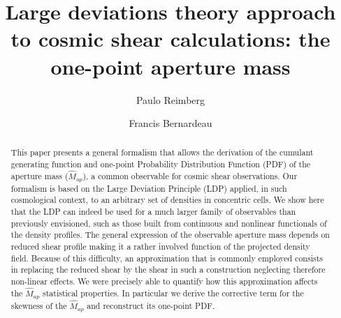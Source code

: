 \documentclass[twocolumn,aps,reprint, nofootinbib]{revtex4}
\newcommand{\Map}{\hat{M}_{ap}}
\begin{document}
\title{Large deviations theory approach to cosmic shear calculations: the one-point aperture mass}


\author{Paulo Reimberg}
\author{Francis Bernardeau}

 
\begin{abstract}
This paper presents a general formalism that allows the derivation of the cumulant generating function and one-point Probability Distribution Function (PDF) of the aperture mass ($\Map$), a common observable for cosmic shear observations. Our formalism is based on the Large Deviation Principle (LDP) applied, in such cosmological context, to an arbitrary set of densities in concentric cells. We show here that the LDP can indeed be used for a much larger family of observables than previously envisioned, such as those built from continuous and nonlinear functionals of the density profiles. 
The general expression of the observable aperture mass depends on reduced shear profile making it a rather involved function of the projected density field. Because of this difficulty, an approximation that is commonly employed consists in replacing the reduced shear by the shear in such a construction neglecting therefore non-linear effects.
We were precisely able to quantify how this approximation affects the $\Map$
statistical properties. In particular we derive  the corrective term for the skewness of the $\Map$ and reconstruct its one-point PDF.
\end{abstract}





\maketitle

\end{document}
